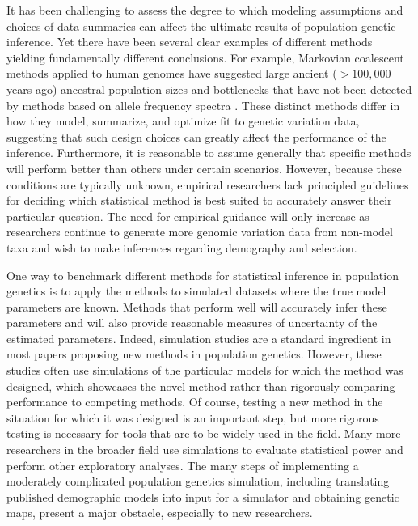 \documentclass[12pt,halfline,a4paper]{ouparticle}
\begin{document}
It has been challenging to assess the degree to which modeling assumptions
and choices of data summaries can affect the ultimate results of population
genetic inference. Yet there 
have been several clear examples of different methods yielding fundamentally
different conclusions. For example, Markovian coalescent methods applied to human genomes have
suggested large ancient ($>100,000$ years ago) ancestral population sizes and
bottlenecks that have not been detected by methods based on allele frequency spectra
\citep[see][]{beichman2017comparison}.
These distinct methods differ in how they model, summarize, and optimize fit to
genetic variation data, suggesting that such design choices can greatly affect the
performance of the inference. Furthermore, it is reasonable
to assume generally that specific methods will perform better than others under certain scenarios.
However, because these conditions are typically unknown, empirical researchers
lack principled guidelines for deciding which statistical method is best suited
to accurately answer their particular question. The need for empirical
guidance will only increase as researchers continue to generate more genomic
variation data from non-model taxa and wish to make inferences regarding
demography and selection.

One way to benchmark different methods for statistical inference in population
genetics is to apply the methods to simulated datasets where the true model
parameters are known. Methods that perform well will accurately infer these
parameters and will also provide reasonable measures of uncertainty of the
estimated parameters. Indeed, simulation studies are a standard ingredient in
most papers proposing new methods in population genetics. However, these
studies often use simulations of the particular models for which the method was designed,
which showcases the novel method rather than rigorously comparing performance to competing methods.
Of course, testing a new method in the situation for which it was designed is an important step,
but more rigorous testing is necessary for tools that are to be widely used in the field.
Many more researchers in the broader field
use simulations to evaluate statistical power and perform other exploratory analyses.
The many steps of implementing a moderately complicated population genetics simulation,
including translating published demographic models into input for a simulator
and obtaining genetic maps,
present a major obstacle, especially to new researchers.
\end{document}
